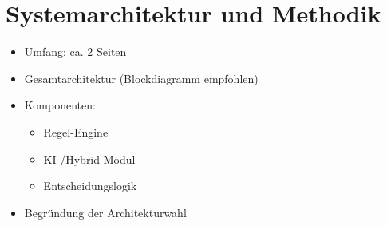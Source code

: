 \section{Systemarchitektur und Methodik}
\begin{itemize}
    \item Umfang: ca. 2 Seiten
    \item Gesamtarchitektur (Blockdiagramm empfohlen)
    \item Komponenten:
    \begin{itemize}
        \item Regel-Engine
        \item KI-/Hybrid-Modul
        \item Entscheidungslogik
    \end{itemize}
    \item Begründung der Architekturwahl
\end{itemize}
